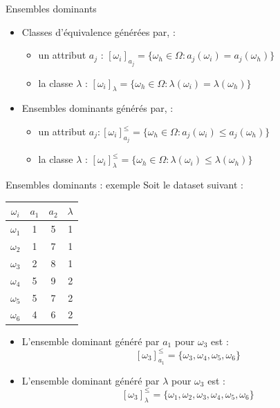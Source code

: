 \documentclass[usenames,dvipsnames]{beamer}
\begin{document}
\begin{frame}{Ensembles dominants}
\begin{itemize}
\item Classes d'équivalence générées par, : 
\begin{itemize}
\item un attribut $a_j$ : $[\omega_i]_{a_j} = \{\omega_h \in \Omega : a_j(\omega_i) = a_j(\omega_h)\}$
\item la classe $\lambda$ : $[\omega_i]_{\lambda} = \{\omega_h \in \Omega : \lambda(\omega_i) = \lambda(\omega_h)\}$
\end{itemize}

\item Ensembles dominants générés par, :
\begin{itemize}
\item un attribut $a_j : [\omega_i]^{\leq}_{a_j} = \{\omega_h \in \Omega : a_j(\omega_i) \leq a_j(\omega_h)\}$
\item la classe $\lambda$ : $[\omega_i]^{\leq}_{\lambda} = \{\omega_h \in \Omega : \lambda(\omega_i) \leq \lambda(\omega_h)\}$
\end{itemize}

\end{itemize}
\end{frame}

\begin{frame}{Ensembles dominants : exemple}
Soit le dataset suivant :

\begin{table}
\begin{tabular}{|*{3}{c|} | c |}
    \hline
        $\omega_i$ & $a_1$ & $a_2$ & $\lambda$ \\
    \hline 
        $\omega_1$ & 1 & 5 & 1 \\ 
        $\omega_2$ & 1 & 7 & 1 \\
        $\omega_3$ & 2 & 8 & 1\\
        $\omega_4$ & 5 & 9 & 2 \\
        $\omega_5$ & 5 & 7 & 2 \\ 
        $\omega_6$ & 4  & 6 & 2\\
    \hline
\end{tabular}

\begin{itemize}
    \item L'ensemble dominant généré par $a_1$ pour $\omega_3$ est : 
        $$[\omega_3]^{\leq}_{a_1} = \{\omega_3, \omega_4, \omega_5, \omega_6\}$$
    \item L'ensemble dominant généré par $\lambda$ pour $\omega_3$ est :
        $$[\omega_3]^{\leq}_{\lambda} = \{\omega_1, \omega_2, \omega_3, \omega_4, \omega_5, \omega_6\}$$
\end{itemize}

\label{tab:dsa-dataset}



\end{table}


\end{frame}
\end{document}
